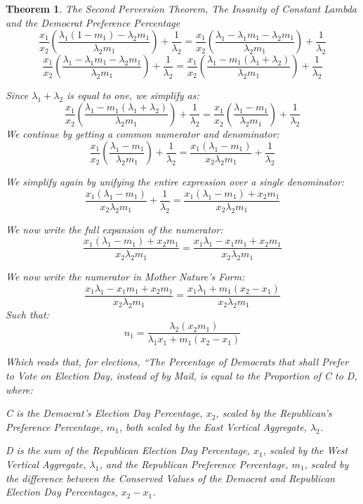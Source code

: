 \documentclass[preprint,13pt]{elsarticle}
\newtheorem{theorem}{Theorem}[section]
\begin{document}
\begin{theorem}{The Second Perversion Theorem, The Insanity of Constant Lambda and the Democrat Preference Percentage}
$$\frac{x_{1}}{x_{2}}\left(\frac{\lambda_{1}(1-m_{1})-\lambda_{2}m_{1}}{\lambda_{2}m_{1}} \right)+\frac{1}{\lambda_{2}}=\frac{x_{1}}{x_{2}}\left(\frac{\lambda_{1}-\lambda_{1}m_{1}-\lambda_{2}m_{1}}{\lambda_{2}m_{1}} \right)+\frac{1}{\lambda_{2}}$$
$$\frac{x_{1}}{x_{2}}\left(\frac{\lambda_{1}-\lambda_{1}m_{1}-\lambda_{2}m_{1}}{\lambda_{2}m_{1}} \right)+\frac{1}{\lambda_{2}}=\frac{x_{1}}{x_{2}}\left(\frac{\lambda_{1}-m_{1}(\lambda_{1}+\lambda_{2})}{\lambda_{2}m_{1}} \right)+\frac{1}{\lambda_{2}}$$

Since $\lambda_{1}+\lambda_{2}$ is equal to one, we simplify as:
$$\frac{x_{1}}{x_{2}}\left(\frac{\lambda_{1}-m_{1}(\lambda_{1}+\lambda_{2})}{\lambda_{2}m_{1}} \right)+\frac{1}{\lambda_{2}}=\frac{x_{1}}{x_{2}}\left(\frac{\lambda_{1}-m_{1}}{\lambda_{2}m_{1}} \right)+\frac{1}{\lambda_{2}}$$
\newpage
We continue by getting a common numerator and denominator:
$$\frac{x_{1}}{x_{2}}\left(\frac{\lambda_{1}-m_{1}}{\lambda_{2}m_{1}} \right)+\frac{1}{\lambda_{2}}=\frac{x_{1}(\lambda_{1}-m_{1})}{x_{2}\lambda_{2}m_{1}}+\frac{1}{\lambda_{2}}$$

We simplify again by unifying the entire expression over a single denominator:
$$\frac{x_{1}(\lambda_{1}-m_{1})}{x_{2}\lambda_{2}m_{1}}+\frac{1}{\lambda_{2}}=\frac{x_{1}(\lambda_{1}-m_{1})+x_{2}m_{1}}{x_{2}\lambda_{2}m_{1}}$$

We now write the full expansion of the numerator:
$$\frac{x_{1}(\lambda_{1}-m_{1})+x_{2}m_{1}}{x_{2}\lambda_{2}m_{1}}=\frac{x_{1}\lambda_{1}-x_{1}m_{1}+x_{2}m_{1}}{x_{2}\lambda_{2}m_{1}}$$

We now write the numerator in Mother Nature's Form:
$$\frac{x_{1}\lambda_{1}-x_{1}m_{1}+x_{2}m_{1}}{x_{2}\lambda_{2}m_{1}}=\frac{x_{1}\lambda_{1}+m_{1}(x_{2}-x_{1})}{x_{2}\lambda_{2}m_{1}}$$
Such that:
$$n_{1}=\frac{\lambda_{2}(x_{2}m_{1})}{\lambda_{1}x_{1}+m_{1}(x_{2}-x_{1})}$$

Which reads that, for elections, ``The Percentage of Democrats that shall Prefer to Vote on Election Day, instead of by Mail, is equal to the Proportion of C to D, where:

C is the Democrat's Election Day Percentage, $x_{2}$, scaled by the Republican's Preference Percentage, $m_{1}$, both scaled by the East Vertical Aggregate, $\lambda_{2}$.

D is the sum of the Republican Election Day Percentage, $x_{1}$, scaled by the West Vertical Aggregate, $\lambda_{1}$, and the Republican Preference Percentage, $m_{1}$, scaled by the difference between the Conserved Values of the Democrat and Republican Election Day Percentages, $x_{2}-x_{1}$.


\end{theorem}
\end{document}
